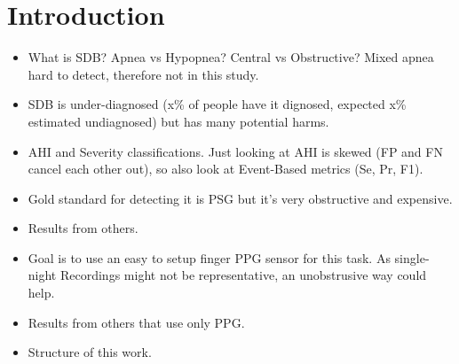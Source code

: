 \chapter{Introduction \label{Chapter-Intro}}

\begin{itemize}
    \item What is SDB? Apnea vs Hypopnea? Central vs Obstructive? Mixed apnea hard to detect, therefore not in this study.
    \item SDB is under-diagnosed (x\% of people have it dignosed, expected x\% estimated undiagnosed) but has many potential harms.
    \item AHI and Severity classifications. Just looking at AHI is skewed (FP and FN cancel each other out), so also look at Event-Based metrics (Se, Pr, F1).
    \item Gold standard for detecting it is PSG but it's very obstructive and expensive.
    \item Results \cite{xie2023use} from others.
    \item Goal is to use an easy to setup finger PPG sensor for this task. As single-night Recordings might not be representative, an unobstrusive way could help.
    \item Results from others that use only PPG.
    \item Structure of this work.
\end{itemize}